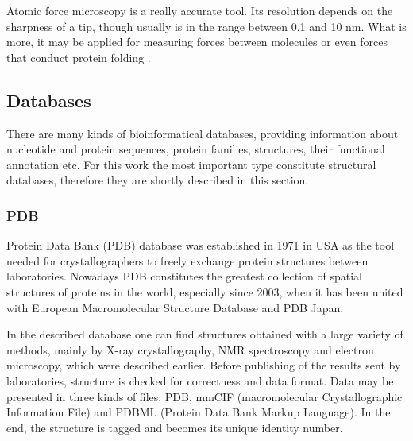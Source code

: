 Atomic force microscopy is a really accurate tool. Its resolution depends on the sharpness of a tip, though usually is in the range between 0.1 and 10 nm. What is more, it may be applied for measuring forces between molecules or even forces that conduct protein folding \cite{Goodsell04}.
\subsection{Databases} %
There are many kinds of bioinformatical databases, providing information about nucleotide and protein sequences, protein families, structures, their functional annotation etc. For this work the most important type constitute structural databases, therefore they are shortly described in this section.


\subsubsection{PDB}
Protein Data Bank (PDB) database was established in 1971 in USA as the tool needed for crystallographers to freely exchange protein structures between laboratories. Nowadays PDB constitutes the greatest collection of spatial structures of proteins in the world, especially since 2003, when it has been united with European Macromolecular Structure Database and PDB Japan. 

In the described database one can find structures obtained with a large variety of methods, mainly by X-ray crystallography, NMR spectroscopy and electron microscopy, which were described earlier. Before publishing of the results sent by laboratories, structure is checked for correctness and data format. Data may be presented in three kinds of files: PDB, mmCIF (macromolecular Crystallographic Information File) and PDBML (Protein Data Bank Markup Language). In the end, the structure is tagged and becomes its unique identity number. 

